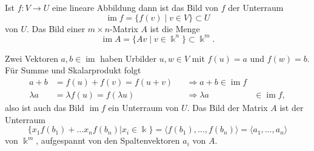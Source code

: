 \begin{definition}
Ist $f\colon V\to U$ eine lineare Abbildung dann ist das Bild von $f$
der Unterraum 
\[
\operatorname{im}f = \{ f(v)\;|\;v\in V\} \subset U
\]
von $U$.
Das Bild einer $m\times n$-Matrix $A$ ist die Menge
\[
\operatorname{im}A = \{ Av \;|\; v\in\Bbbk^n\} \subset \Bbbk^m.
\]
\end{definition}

Zwei Vektoren $a,b\in\operatorname{im}$ haben Urbilder $u,w\in V$ mit
$f(u)=a$ und $f(w)=b$.
Für Summe und Skalarprodukt folgt
\[
\begin{aligned}
a+b&= f(u)+f(v)=f(u+v) &&\Rightarrow a+b\in\operatorname{im}f\\
\lambda a&=\lambda f(u) = f(\lambda u) &&\Rightarrow \lambda a&\in\operatorname{im}f,
\end{aligned}
\]
also ist auch das Bild $\operatorname{im}f$ ein Unterraum von $U$.
Das Bild der Matrix $A$ ist der Unterraum
\[
\{ x_1f(b_1) + \dots x_n f(b_n) | x_i\in\Bbbk\}
=
\langle f(b_1),\dots,f(b_n)\rangle
=
\langle a_1,\dots,a_n\rangle
\]
von $\Bbbk^m$, aufgespannt von den Spaltenvektoren $a_i$ von $A$.

